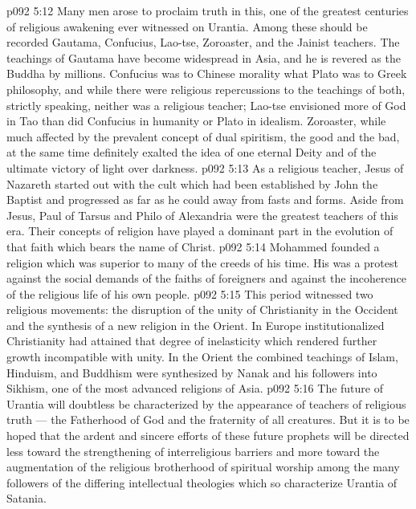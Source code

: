 \vs p092 5:12 \bibnobreakspace {} Many men arose to proclaim truth in this, one of the greatest centuries of religious awakening ever witnessed on Urantia. Among these should be recorded Gautama, Confucius, Lao\hyp{}tse, Zoroaster, and the Jainist teachers. The teachings of Gautama have become widespread in Asia, and he is revered as the Buddha by millions. Confucius was to Chinese morality what Plato was to Greek philosophy, and while there were religious repercussions to the teachings of both, strictly speaking, neither was a religious teacher; Lao\hyp{}tse envisioned more of God in Tao than did Confucius in humanity or Plato in idealism. Zoroaster, while much affected by the prevalent concept of dual spiritism, the good and the bad, at the same time definitely exalted the idea of one eternal Deity and of the ultimate victory of light over darkness.
\vs p092 5:13 \bibnobreakspace {} As a religious teacher, Jesus of Nazareth started out with the cult which had been established by John the Baptist and progressed as far as he could away from fasts and forms. Aside from Jesus, Paul of Tarsus and Philo of Alexandria were the greatest teachers of this era. Their concepts of religion have played a dominant part in the evolution of that faith which bears the name of Christ.
\vs p092 5:14 \bibnobreakspace {} Mohammed founded a religion which was superior to many of the creeds of his time. His was a protest against the social demands of the faiths of foreigners and against the incoherence of the religious life of his own people.
\vs p092 5:15 \bibnobreakspace {} This period witnessed two religious movements: the disruption of the unity of Christianity in the Occident and the synthesis of a new religion in the Orient. In Europe institutionalized Christianity had attained that degree of inelasticity which rendered further growth incompatible with unity. In the Orient the combined teachings of Islam, Hinduism, and Buddhism were synthesized by Nanak and his followers into Sikhism, one of the most advanced religions of Asia.
\vs p092 5:16 \pc The future of Urantia will doubtless be characterized by the appearance of teachers of religious truth --- the Fatherhood of God and the fraternity of all creatures. But it is to be hoped that the ardent and sincere efforts of these future prophets will be directed less toward the strengthening of interreligious barriers and more toward the augmentation of the religious brotherhood of spiritual worship among the many followers of the differing intellectual theologies which so characterize Urantia of Satania.
